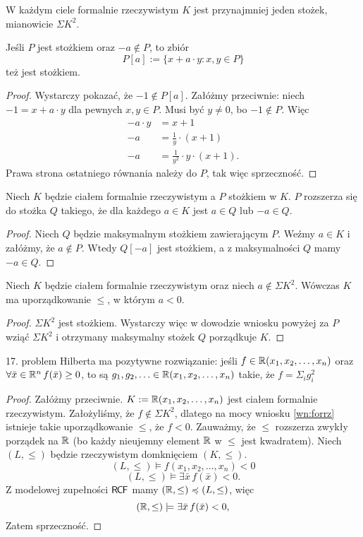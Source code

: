 \documentclass{article}
\begin{document}
\begin{uw}
	W każdym ciele formalnie rzeczywistym $K$ jest przynajmniej jeden stożek, mianowicie $\Sigma K^2$.
\end{uw}
\begin{stw}
	Jeśli $P$ jest stożkiem oraz $-a \not \in P$, to zbiór $$P[a] := \{x + a \cdot y \colon x, y \in P\}$$ też jest stożkiem.
\end{stw}
\begin{proof}
	Wystarczy pokazać, że $-1 \not \in P[a]$.
	Załóżmy przeciwnie: niech $-1 = x + a \cdot y$ dla pewnych $x, y \in P$.
	Musi być $y \neq 0$, bo $-1 \not \in P$.
	Więc
	\begin{align*}
		-a \cdot y &= x + 1 \\
		-a &= \frac{1}{y} \cdot (x + 1) \\
		-a &= \frac{1}{y^2} \cdot y \cdot (x + 1).
	\end{align*}
	Prawa strona ostatniego równania należy do  $P$, tak więc sprzeczność.
\end{proof}
\begin{wn}
	 Niech $K$ będzie ciałem formalnie rzeczywistym a $P$ stożkiem w $K$.
	 $P$ rozszerza się do stożka $Q$ takiego, że dla każdego $a \in K$ jest $a \in Q$ lub $-a \in Q$.
\end{wn}
\begin{proof}
	 Niech $Q$ będzie maksymalnym stożkiem zawierającym $P$.
	 Weźmy $a \in K$ i załóżmy, że $a \not \in P$.
	 Wtedy $Q[-a]$ jest stożkiem, a z maksymalności $Q$ mamy $-a \in Q$.
\end{proof}

\begin{wn}
	\label{wn:forrz}
	 Niech $K$ będzie ciałem formalnie rzeczywistym oraz niech $a \not \in \Sigma K^2$.
	 Wówczas $K$ ma uporządkowanie $\leq$, w którym $a < 0$.
\end{wn}
\begin{proof}
	 $\Sigma K^2$ jest stożkiem.
	 Wystarczy więc w dowodzie wniosku powyżej za $P$ wziąć $\Sigma K^2$ i otrzymany maksymalny stożek $Q$ porządkuje $K$.
\end{proof}

\begin{tw}
	 17. problem Hilberta ma pozytywne rozwiązanie:
	 jeśli $f \in \mathbb{R}(x_1, x_2, \ldots, x_n)$ oraz $\forall \bar{x} \in \mathbb{R}^n \, f(\bar{x}) \geq 0$,
	 to są $g_1, g_2, \ldots \in \mathbb{R}(x_1, x_2, \ldots, x_n)$ takie, że $f = \Sigma_i g_i^2$
\end{tw}
\begin{proof}
	 Załóżmy przeciwnie.
	 $K := \mathbb{R}(x_1, x_2, \ldots, x_n) $ jest ciałem formalnie rzeczywistym.
	 Założyliśmy, że $f \not \in \Sigma K^2$, dlatego na mocy wniosku \ref{wn:forrz} istnieje takie uporządkowanie $\leq$,
	 że $f < 0$.
	 Zauważmy, że $\leq$ rozszerza zwykły porządek na $\mathbb{R}$ (bo każdy nieujemny element $\mathbb{R}$ w $\leq$ jest kwadratem).
	 Niech $(L, \leq)$ będzie rzeczywistym domknięciem $(K, \leq)$.
	 \[
	 	 (L, \leq) \models f(x_1, x_2, \ldots, x_n ) < 0
	 \]
	 \[
	 	 (L, \leq) \models \exists \bar{x}  \, f(\bar{x}) < 0.
	 \]
	 Z modelowej zupełności $\mathsf{R \mkern-1.7mu C \mkern-1.4mu F}$ mamy $(\mathbb{R}, \leq) \preccurlyeq (L, \leq)$, więc
	 \[
	 	 (\mathbb{R}, \leq) \models  \exists \bar{x}  \, f(\bar{x}) < 0,
	 \]
Zatem sprzeczność.
\end{proof}
\end{document}
